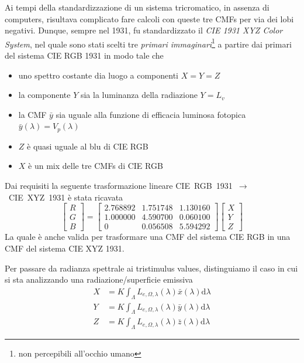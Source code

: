 Ai tempi della standardizzazione di un sistema tricromatico, in assenza di computers, risultava complicato fare calcoli con queste tre CMFs per via dei
lobi negativi. Dunque, sempre nel 1931, fu standardizzato il \textit{CIE 1931 XYZ Color System}, nel quale sono stati scelti tre 
\textit{primari immaginari}\footnote{non percepibili all'occhio umano} a partire dai primari del sistema CIE RGB 1931 in modo tale che
\begin{itemize}[topsep=0pt, noitemsep]
	\item uno spettro costante dia luogo a componenti $X = Y = Z$
	\item la componente $Y$ sia la luminanza della radiazione $Y = L_v$
	\item la CMF $\bar{y}$ sia uguale alla funzione di efficacia luminosa fotopica $\bar{y}(\lambda) = V_p(\lambda)$
	\item $Z$ \`e quasi uguale al blu di CIE RGB
	\item $X$ \`e un mix delle tre CMFs di CIE RGB
\end{itemize}
Dai requisiti la seguente trasformazione lineare \mbox{CIE RGB 1931 $\rightarrow$ CIE XYZ 1931} \`e stata ricavata
\begin{equation}\label{chapter2:colorimetry:RGB2XYZ}
	\begin{bmatrix}
		R \\ G \\ B
	\end{bmatrix}
	=
	\begin{bmatrix}
		2.768892 & 1.751748 & 1.130160 \\
		1.000000 & 4.590700 & 0.060100 \\
		0 & 0.056508 & 5.594292
	\end{bmatrix}
	\begin{bmatrix}
		X \\ Y \\ Z
	\end{bmatrix}
\end{equation}
La quale \`e anche valida per trasformare una CMF del sistema CIE RGB in una CMF del sistema CIE XYZ 1931.\par
Per passare da radianza spettrale ai tristimulus values, distinguiamo il caso in cui si sta analizzando una radiazione/superficie emissiva
\begin{align}\label{chapter2:colorimetry:spectrum2XYZ4Source}
	X &= K\int_\Lambda L_{e,\Omega,\lambda}(\lambda)\bar{x}(\lambda)\mathrm{d}\lambda\\
	Y &= K\int_\Lambda L_{e,\Omega,\lambda}(\lambda)\bar{y}(\lambda)\mathrm{d}\lambda\\
	Z &= K\int_\Lambda L_{e,\Omega,\lambda}(\lambda)\bar{z}(\lambda)\mathrm{d}\lambda
\end{align}
